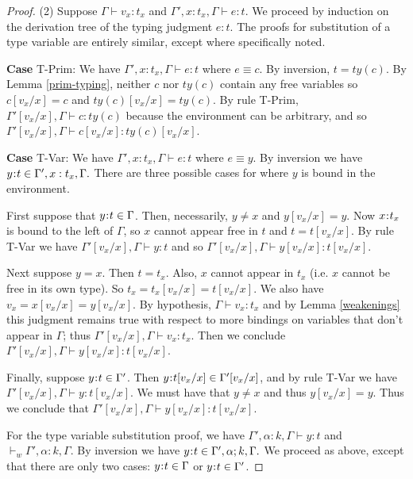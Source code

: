 \documentclass[11pt]{article}
\newcommand{\al}{\alpha}
\newcommand{\bind}{\hspace{0.05em}{:}\hspace{0.05em}} %
\begin{document}
\begin{proof}
(2) Suppose $\Gamma \vdash v_x:t_x$ and $\Gamma', x:t_x ,\Gamma \vdash e : t$. We proceed by induction on the derivation tree of the typing judgment $e:t$. The proofs for substitution of a type variable are entirely similar, except where specifically noted.

{\bf Case} {\sc T-Prim}: We have $\Gamma', x:t_x,\Gamma \vdash e : t$ where $e \equiv c$. By inversion, $t = ty(c)$. By Lemma \ref{prim-typing}, neither $c$ nor $ty(c)$ contain any free variables so $c[v_x/x] = c$ and $ty(c)[v_x/x] = ty(c)$.
By rule {\sc T-Prim},
$\Gamma'[v_x/x],\Gamma \vdash c : ty(c)$ 
because the environment can be arbitrary,
and so
$\Gamma'[v_x/x],\Gamma \vdash c[v_x/x] : ty(c)[v_x/x]$.

{\bf Case} {\sc T-Var}: We have $\Gamma', x:t_x,\Gamma \vdash e : t$ where $e \equiv y$. By inversion we have $y\bind t \in \Gamma', x:t_x,\Gamma.$ There are three possible cases for where $y$ is bound in the environment.

First suppose that $y\bind t \in \Gamma$. Then, necessarily, $y\neq x$ and $y[v_x/x] = y.$ Now $x\bind t_x$ is bound to the left of $\Gamma$, so $x$ cannot appear free in $t$ and $t = t[v_x/x]$. By rule {\sc T-Var} we have $\Gamma'[v_x/x], \Gamma \vdash y : t$ and so $\Gamma'[v_x/x], \Gamma \vdash y[v_x/x] : t[v_x/x] $.

Next suppose $y = x$. Then $t = t_x$. Also, $x$ cannot appear in $t_x$ (i.e. $x$ cannot be free in its own type). So $t_x = t_x[v_x/x] = t[v_x/x]$. We also have $v_x = x[v_x/x] = y[v_x/x]$.
By hypothesis, $\Gamma \vdash v_x : t_x$ and by Lemma \ref{weakenings} this judgment remains true with respect to more bindings on variables that don't appear in $\Gamma$; thus $\Gamma'[v_x/x], \Gamma \vdash v_x : t_x$. Then we conclude $\Gamma'[v_x/x], \Gamma \vdash y[v_x/x] : t[v_x/x]$.

Finally, suppose  $y\bind t \in \Gamma'$. Then $y\bind t[v_x/x] \in \Gamma'[v_x/x]$, and by rule {\sc T-Var} we have $\Gamma'[v_x/x], \Gamma \vdash y : t[v_x/x]$. We must have that $y\neq x$ and thus $y[v_x/x] = y$. Thus we conclude that $\Gamma'[v_x/x], \Gamma \vdash y[v_x/x] : t[v_x/x]$.

For the type variable substitution proof, we have $\Gamma', \al:k,\Gamma \vdash y : t$ and $\vdash_w \Gamma', \al:k,\Gamma$. By inversion we have $y\bind t \in \Gamma', \al;k ,\Gamma.$ We proceed as above, except that there are only two cases: $y\bind t \in \Gamma$ or $y\bind t \in \Gamma'$.


\end{proof}
\end{document}
